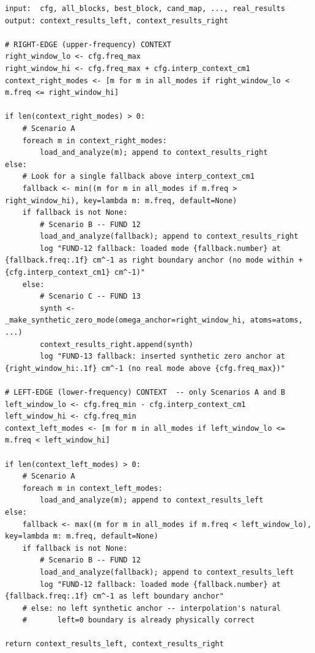 \documentclass[10pt,a4paper,twoside]{article}
\newcommand{\fn}[1]{\texttt{#1}}
\begin{document}
\begin{lstlisting}[style=pseudo,
  caption={Context-mode loading with FUND 12 + FUND 13 fallbacks.
           Implementation: \protect\fn{runner.\_run\_analysis\_single},
           helper \protect\fn{runner.\_make\_synthetic\_zero\_mode}.}]
input:  cfg, all_blocks, best_block, cand_map, ..., real_results
output: context_results_left, context_results_right

# RIGHT-EDGE (upper-frequency) CONTEXT
right_window_lo <- cfg.freq_max
right_window_hi <- cfg.freq_max + cfg.interp_context_cm1
context_right_modes <- [m for m in all_modes if right_window_lo < m.freq <= right_window_hi]

if len(context_right_modes) > 0:
    # Scenario A
    foreach m in context_right_modes:
        load_and_analyze(m); append to context_results_right
else:
    # Look for a single fallback above interp_context_cm1
    fallback <- min((m for m in all_modes if m.freq > right_window_hi), key=lambda m: m.freq, default=None)
    if fallback is not None:
        # Scenario B -- FUND 12
        load_and_analyze(fallback); append to context_results_right
        log "FUND-12 fallback: loaded mode {fallback.number} at {fallback.freq:.1f} cm^-1 as right boundary anchor (no mode within +{cfg.interp_context_cm1} cm^-1)"
    else:
        # Scenario C -- FUND 13
        synth <- _make_synthetic_zero_mode(omega_anchor=right_window_hi, atoms=atoms, ...)
        context_results_right.append(synth)
        log "FUND-13 fallback: inserted synthetic zero anchor at {right_window_hi:.1f} cm^-1 (no real mode above {cfg.freq_max})"

# LEFT-EDGE (lower-frequency) CONTEXT  -- only Scenarios A and B
left_window_lo <- cfg.freq_min - cfg.interp_context_cm1
left_window_hi <- cfg.freq_min
context_left_modes <- [m for m in all_modes if left_window_lo <= m.freq < left_window_hi]

if len(context_left_modes) > 0:
    # Scenario A
    foreach m in context_left_modes:
        load_and_analyze(m); append to context_results_left
else:
    fallback <- max((m for m in all_modes if m.freq < left_window_lo), key=lambda m: m.freq, default=None)
    if fallback is not None:
        # Scenario B -- FUND 12
        load_and_analyze(fallback); append to context_results_left
        log "FUND-12 fallback: loaded mode {fallback.number} at {fallback.freq:.1f} cm^-1 as left boundary anchor"
    # else: no left synthetic anchor -- interpolation's natural
    #       left=0 boundary is already physically correct

return context_results_left, context_results_right
\end{lstlisting}
\end{document}
